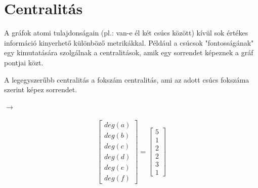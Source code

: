 \documentclass[12pt,numbers=noenddot]{report}
\begin{document}
\section{Centralitás}
A gráfok atomi tulajdonságain (pl.: van-e él két csúcs között) kívül sok 
értékes információ kinyerhető különböző metrikákkal. Például a csúcsok 
"fontosságának" egy kimutatására szolgálnak a centralitások, amik egy sorrendet 
képeznek a gráf pontjai közt. 

A legegyszerűbb centralitás a fokszám centralitás, ami az adott csúcs fokszáma 
szerint képez sorrendet.


\noindent
\begin{minipage}[c]{0.4\linewidth}


\end{minipage}
\noindent
\begin{minipage}[c]{0.2\linewidth}

\hspace{0.5cm}
$\rightarrow$

\end{minipage}
\begin{minipage}[c]{0.2\linewidth}

\begin{align}
	\begin{bmatrix}
		deg(a)\\
		deg(b)\\
		deg(c)\\
		deg(d)\\
		deg(e)\\
		deg(f)
	\end{bmatrix}
	=
	\begin{bmatrix}
		5\\
		1\\
		2\\
		2\\
		3\\
		1
	\end{bmatrix}
\end{align}

\end{minipage}
\end{document}
